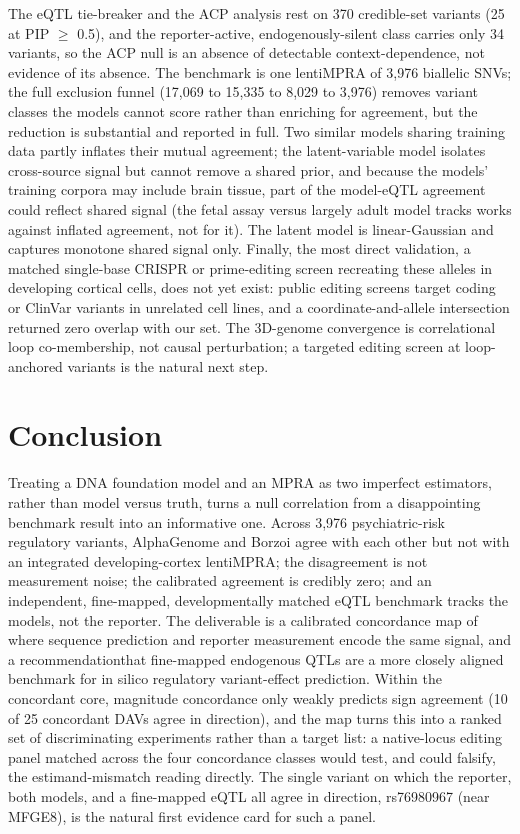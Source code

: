 \documentclass[9pt,twocolumn]{article}
\begin{document}
The eQTL tie-breaker and the ACP analysis rest on 370 credible-set variants (25 at PIP $\ge$ 0.5), and the reporter-active, endogenously-silent class carries only 34 variants, so the ACP null is an absence of detectable context-dependence, not evidence of its absence. The benchmark is one lentiMPRA of 3,976 biallelic SNVs; the full exclusion funnel (17,069 to 15,335 to 8,029 to 3,976) removes variant classes the models cannot score rather than enriching for agreement, but the reduction is substantial and reported in full. Two similar models sharing training data partly inflates their mutual agreement; the latent-variable model isolates cross-source signal but cannot remove a shared prior, and because the models' training corpora may include brain tissue, part of the model-eQTL agreement could reflect shared signal (the fetal assay versus largely adult model tracks works against inflated agreement, not for it). The latent model is linear-Gaussian and captures monotone shared signal only. Finally, the most direct validation, a matched single-base CRISPR or prime-editing screen recreating these alleles in developing cortical cells, does not yet exist: public editing screens target coding or ClinVar variants in unrelated cell lines, and a coordinate-and-allele intersection returned zero overlap with our set. The 3D-genome convergence is correlational loop co-membership, not causal perturbation; a targeted editing screen at loop-anchored variants is the natural next step.


\section{Conclusion}

Treating a DNA foundation model and an MPRA as two imperfect estimators, rather than model versus truth, turns a null correlation from a disappointing benchmark result into an informative one. Across 3,976 psychiatric-risk regulatory variants, AlphaGenome and Borzoi agree with each other but not with an integrated developing-cortex lentiMPRA; the disagreement is not measurement noise; the calibrated agreement is credibly zero; and an independent, fine-mapped, developmentally matched eQTL benchmark tracks the models, not the reporter. The deliverable is a calibrated concordance map of where sequence prediction and reporter measurement encode the same signal, and a recommendationthat fine-mapped endogenous QTLs are a more closely aligned benchmark for in silico regulatory variant-effect prediction. Within the concordant core, magnitude concordance only weakly predicts sign agreement (10 of 25 concordant DAVs agree in direction), and the map turns this into a ranked set of discriminating experiments rather than a target list: a native-locus editing panel matched across the four concordance classes would test, and could falsify, the estimand-mismatch reading directly. The single variant on which the reporter, both models, and a fine-mapped eQTL all agree in direction, rs76980967 (near MFGE8), is the natural first evidence card for such a panel.
\end{document}
